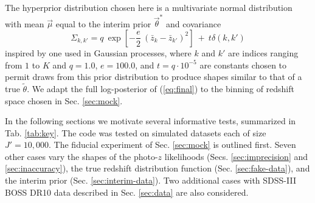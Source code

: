 \documentclass[preprint]{aastex}
\begin{document}
The hyperprior distribution chosen here is a multivariate normal distribution 
with mean $\vec{\mu}$ equal to the interim prior $\vec{\theta}^{*}$ and 
covariance
\begin{equation}
\label{eq:priorcov}
\Sigma_{k,k'} = q\ \exp[-\frac{e}{2}\ (\bar{z}_{k}-\bar{z}_{k'})^{2}]\ +\ 
t\delta(k,k')
\end{equation}
inspired by one used in Gaussian processes, where $k$ and $k'$ are indices 
ranging from $1$ to $K$ and $q=1.0$, $e=100.0$, and $t=q\cdot10^{-5}$ are 
constants chosen to permit draws from this prior distribution to produce shapes 
similar to that of a true $\tilde{\theta}$.  We adapt the full log-posterior of 
(\ref{eq:final}) to the binning of redshift space chosen in Sec. \ref{sec:mock}.

In the following sections we motivate several informative tests, summarized in 
Tab. \ref{tab:key}.  The code was tested on simulated datasets each of size 
$J'=10,000$.  The fiducial experiment of Sec. \ref{sec:mock} is outlined first. 
 Seven other cases vary the shapes of the photo-$z$ likelihoods (Secs. 
\ref{sec:imprecision} and \ref{sec:inaccuracy}), the true redshift distribution 
function (Sec. \ref{sec:fake-data}), and the interim prior (Sec. 
\ref{sec:interim-data}).  Two additional cases with SDSS-III BOSS DR10 data 
described in Sec. \ref{sec:data} are also considered.
\end{document}

